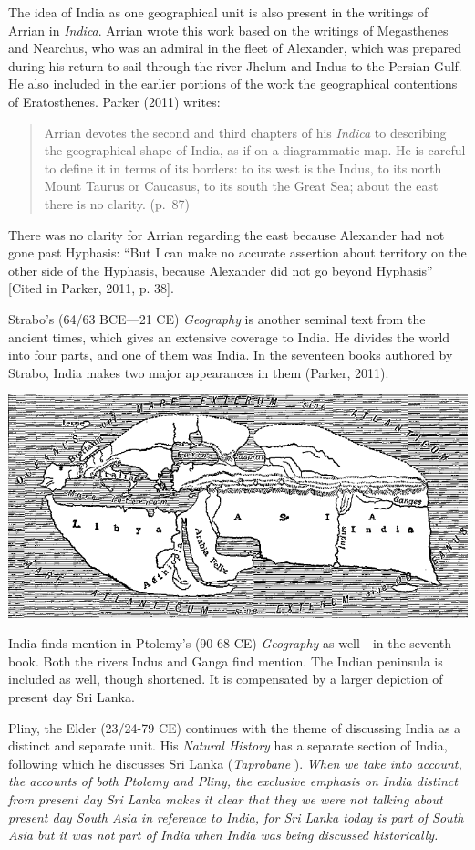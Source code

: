 The idea of India as one geographical unit is also present in the writings of Arrian in \textit{Indica}. Arrian wrote this work based on the writings of Megasthenes and Nearchus, who was an admiral in the fleet of Alexander, which was prepared during his return to sail through the river Jhelum and Indus to the Persian Gulf. He also included in the earlier portions of the work the geographical contentions of Eratosthenes. Parker (2011) writes: 
\begin{quote}
Arrian devotes the second and third chapters of his \textit{Indica} to describing the geographical shape of India, as if on a diagrammatic map. He is careful to define it in terms of its borders: to its west is the Indus, to its north Mount Taurus or Caucasus, to its south the Great Sea; about the east there is no clarity. (p.\ 87) 
\end{quote}
There was no clarity for Arrian regarding the east because Alexander had not gone past Hyphasis: “But I can make no accurate assertion about territory on the other side of the Hyphasis, because Alexander did not go beyond Hyphasis” [Cited in Parker, 2011, p. 38]. 

Strabo’s (64/63 BCE—21 CE) \textit{Geography} is another seminal text from the ancient times, which gives an extensive coverage to India. He divides the world into four parts, and one of them was India. In the seventeen books authored by Strabo, India makes two major appearances in them (Parker, 2011).

\centerline{\includegraphics{figures/appendix-a-fig1.png}}

India finds mention in Ptolemy’s (90-68 CE) \textit{Geography} as well—in the seventh book. Both the rivers Indus and Ganga find mention. The Indian peninsula is included as well, though shortened. It is compensated by a larger depiction of present day Sri Lanka.

Pliny, the Elder (23/24-79 CE) continues with the theme of discussing India as a distinct and separate unit. His \textit{Natural History} has a separate section of India, following which he discusses Sri Lanka (\textit{Taprobane} ). \textit{When we take into account, the accounts of both Ptolemy and Pliny, the exclusive emphasis on India distinct from present day Sri Lanka makes it clear that they we were not talking about present day South Asia in reference to India, for Sri Lanka today is part of South Asia but it was not part of India when India was being discussed historically.} 

